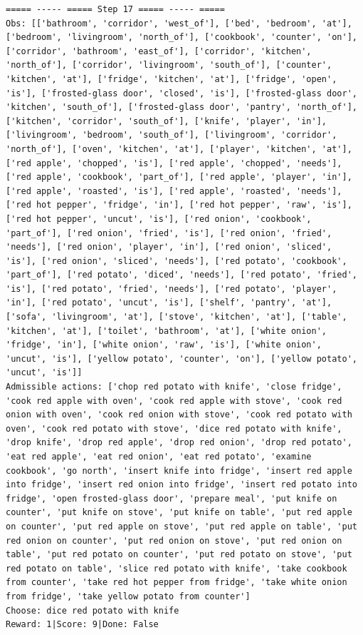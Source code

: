 \documentclass[11pt]{article}
\begin{document}
\begin{lstlisting}
===== ----- ===== Step 17 ===== ----- =====
Obs: [['bathroom', 'corridor', 'west_of'], ['bed', 'bedroom', 'at'], ['bedroom', 'livingroom', 'north_of'], ['cookbook', 'counter', 'on'], ['corridor', 'bathroom', 'east_of'], ['corridor', 'kitchen', 'north_of'], ['corridor', 'livingroom', 'south_of'], ['counter', 'kitchen', 'at'], ['fridge', 'kitchen', 'at'], ['fridge', 'open', 'is'], ['frosted-glass door', 'closed', 'is'], ['frosted-glass door', 'kitchen', 'south_of'], ['frosted-glass door', 'pantry', 'north_of'], ['kitchen', 'corridor', 'south_of'], ['knife', 'player', 'in'], ['livingroom', 'bedroom', 'south_of'], ['livingroom', 'corridor', 'north_of'], ['oven', 'kitchen', 'at'], ['player', 'kitchen', 'at'], ['red apple', 'chopped', 'is'], ['red apple', 'chopped', 'needs'], ['red apple', 'cookbook', 'part_of'], ['red apple', 'player', 'in'], ['red apple', 'roasted', 'is'], ['red apple', 'roasted', 'needs'], ['red hot pepper', 'fridge', 'in'], ['red hot pepper', 'raw', 'is'], ['red hot pepper', 'uncut', 'is'], ['red onion', 'cookbook', 'part_of'], ['red onion', 'fried', 'is'], ['red onion', 'fried', 'needs'], ['red onion', 'player', 'in'], ['red onion', 'sliced', 'is'], ['red onion', 'sliced', 'needs'], ['red potato', 'cookbook', 'part_of'], ['red potato', 'diced', 'needs'], ['red potato', 'fried', 'is'], ['red potato', 'fried', 'needs'], ['red potato', 'player', 'in'], ['red potato', 'uncut', 'is'], ['shelf', 'pantry', 'at'], ['sofa', 'livingroom', 'at'], ['stove', 'kitchen', 'at'], ['table', 'kitchen', 'at'], ['toilet', 'bathroom', 'at'], ['white onion', 'fridge', 'in'], ['white onion', 'raw', 'is'], ['white onion', 'uncut', 'is'], ['yellow potato', 'counter', 'on'], ['yellow potato', 'uncut', 'is']]
Admissible actions: ['chop red potato with knife', 'close fridge', 'cook red apple with oven', 'cook red apple with stove', 'cook red onion with oven', 'cook red onion with stove', 'cook red potato with oven', 'cook red potato with stove', 'dice red potato with knife', 'drop knife', 'drop red apple', 'drop red onion', 'drop red potato', 'eat red apple', 'eat red onion', 'eat red potato', 'examine cookbook', 'go north', 'insert knife into fridge', 'insert red apple into fridge', 'insert red onion into fridge', 'insert red potato into fridge', 'open frosted-glass door', 'prepare meal', 'put knife on counter', 'put knife on stove', 'put knife on table', 'put red apple on counter', 'put red apple on stove', 'put red apple on table', 'put red onion on counter', 'put red onion on stove', 'put red onion on table', 'put red potato on counter', 'put red potato on stove', 'put red potato on table', 'slice red potato with knife', 'take cookbook from counter', 'take red hot pepper from fridge', 'take white onion from fridge', 'take yellow potato from counter']
Choose: dice red potato with knife
Reward: 1|Score: 9|Done: False


\end{lstlisting}
\end{document}
